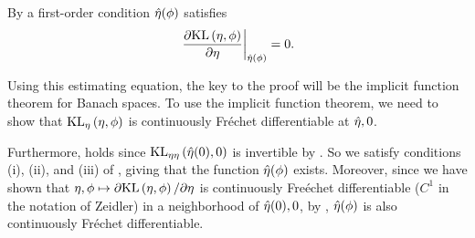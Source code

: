 
%


By a first-order
condition $\hat\eta(\phi)$ satisfies
%
\begin{align*}
%
\fracat{\partial \KL{\eta, \phi}}
                {\partial \eta}
                {\etaopt(\phi)} = 0.
%
\end{align*}


Using this estimating equation, the key to the proof will be the implicit
function theorem for Banach spaces.  To use the implicit function theorem, we
need to show that $\mathrm{KL}_{\eta}\left(\eta, \phi\right)$ is continuously Fr{\'e}chet
differentiable at $\hat\eta, 0$.


%




Furthermore, \citet[Chapter 4 Condition
21b]{zeidler:2013:functional} holds since $\mathrm{KL}_{\eta\eta}\left(\hat\eta(0), 0\right)$ is
invertible by .   So we satisfy conditions (i),
(ii), and (iii) of \citet[Theorem 4.B(c)]{zeidler:2013:functional}, giving that
the function $\hat\eta(\phi)$ exists.  Moreover, since we have shown that $\eta,
\phi \mapsto \partial \mathrm{KL}\left(\eta, \phi\right) / \partial \eta$ is continuously
Fre{\'e}chet differentiable ($C^1$ in the notation of Zeidler) in a neighborhood
of $\hat\eta(0), 0$, by \citet[Theorem 4.B(d)]{zeidler:2013:functional},
$\hat\eta(\phi)$ is also continuously Fr{\'e}chet differentiable.

